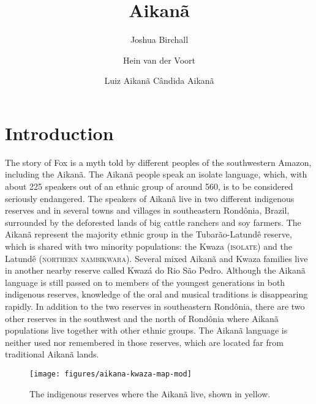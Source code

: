 \documentclass[output=paper,
modfonts,nonflat
]{langsci/langscibook}
\author{Joshua Birchall\affiliation{Museu Paraense Emílio Goeldi}%
\and Hein van der Voort\affiliation{Museu Paraense Emílio Goeldi}%
\and Luiz Aikanã%
\lastand Cândida Aikanã%
}%
\title{Aikanã}
\begin{document}
\section{Introduction} 

The story of Fox is a myth told by different peoples of the southwestern Amazon, including the Aikanã. The Aikanã people speak an isolate language, which, with about 225 speakers out of an ethnic group of around 560, is to be considered seriously endangered. The speakers of Aikanã live in two different indigenous reserves and in several towns and villages in southeastern Rondônia, Brazil, surrounded by the deforested lands of big cattle ranchers and soy farmers. The Aikanã represent the majority ethnic group in the Tubarão-Latundê reserve, which is shared with two minority populations: the Kwaza (\textsc{isolate}) and the Latundê (\textsc{northern nambikwara}). 
Several mixed Aikanã and Kwaza families live in another nearby reserve called Kwazá do Rio São Pedro. 
Although the Aikanã language is still passed on to members of the youngest generations in both indigenous reserves, knowledge of the oral and musical traditions is disappearing rapidly. In addition to the two reserves in southeastern Rondônia, there are two other reserves in the southwest and the north of Rondônia where Aikanã populations live together with other ethnic groups. The Aikanã language is neither used nor remembered in those reserves, which are located far from traditional Aikanã lands. 

\begin{figure}[t]


\texttt{[image: figures/aikana-kwaza-map-mod]}
  \caption{The indigenous reserves where the Aikanã live, shown in yellow.}
\end{figure}
\end{document}
